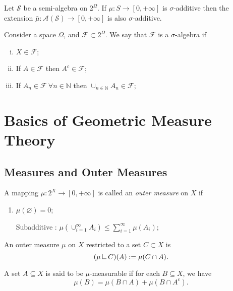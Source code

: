 \begin{lemma}
	Let $\mathcal S$ be a semi-algebra on $2^\Omega$.
	If $\mu:S \to [0,+\infty]$ is $\sigma$-additive
	then the extension $\bar \mu : \mathcal A(\mathcal S)\to [0,+\infty]$
	is also $\sigma$-additive.
\end{lemma}

\begin{definition}
	Consider a space $\Omega$, and $\mathcal F \subset 2^\Omega$.
	We say that $\mathcal F$ is a $\sigma$-algebra if
	\begin{enumerate}[(i)]
		\item $X \in \mathcal F$;
		\item If $A \in \mathcal F$ then $A^c \in \mathcal F$;
		\item If $A_n \in \mathcal F \ \forall n \in \mathbb N$ then $\cup_{n \in \mathbb N} A_n \in \mathcal F$;
	\end{enumerate}
\end{definition}

\section{Basics of Geometric Measure Theory}


\subsection{Measures and Outer Measures}

\begin{definition}
	A mapping $\mu:2^X\to [0,+\infty]$ is called an \textit{outer measure}
	on $X$ if
	\begin{enumerate}
		\item $\mu(\varnothing) = 0$;
		\item [Subadditive]: $\mu(\cup_{i=1}^\infty A_i) \leq \sum_{i=1}^\infty \mu(A_i)$;
	\end{enumerate}
\end{definition}

\begin{definition}
	An outer measure $\mu$ on $X$ restricted to a set $C \subset X$ is
	\begin{displaymath}
		(\mu \mres C) (A) := \mu(C \cap A).
	\end{displaymath}
\end{definition}

\begin{definition}[$\mu$-Measurability]
	A set $A \subseteq X$ is said to be $\mu$-measurable if for each
	$B \subseteq X$, we have
	\begin{displaymath}
		\mu(B) = \mu(B\cap A) + \mu(B \cap A^c).
	\end{displaymath}
\end{definition}

